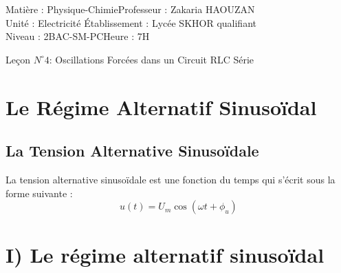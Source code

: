 \documentclass[12pt]{article}
\author{Zakaria HAOUZAN}
\date{\today}
\newcommand\headerMe[2]{\noindent{}#1\hfill#2}
\begin{document}
\headerMe{Matière : Physique-Chimie}{Professeur : Zakaria HAOUZAN}\\
\headerMe{Unité : Electricité }{Établissement : Lycée SKHOR qualifiant}\\
\headerMe{Niveau : 2BAC-SM-PC}{Heure : 7H}\\

\begin{center}

    \Large{Leçon $N^{\circ} 4 $: \color{red} Oscillations Forcées dans un Circuit RLC Série }
\end{center}


\section{Le Régime Alternatif Sinusoïdal}

\subsection{La Tension Alternative Sinusoïdale}
La tension alternative sinusoïdale est une fonction du temps qui s'écrit sous la forme suivante :
\begin{equation}
    u(t) = U_m\cos(\omega t + \phi_u)
\end{equation}



\begin{center}
\end{center}

\section*{I) Le régime alternatif sinusoïdal}
\end{document}
